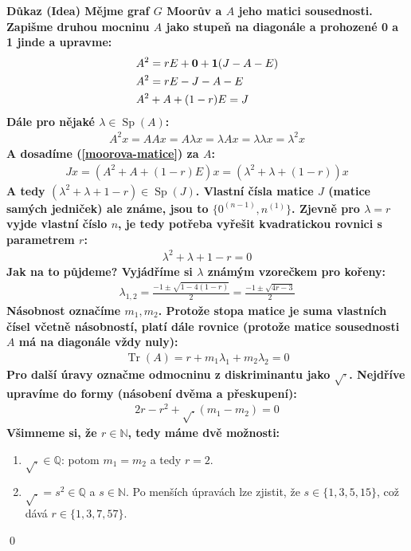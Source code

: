 \documentclass[a4paper,12pt,titlepage]{article}
\newcommand{\dk}{\smallskip\noindent\bf Důkaz\rm{} }
\newcommand{\Q}{\mathbb{Q}}
\newcommand{\N}{\mathbb{N}}
\DeclareMathOperator{\Sp}{Sp}
\DeclareMathOperator{\Tr}{Tr}
\begin{document}
\dk (Idea) Mějme graf $G$ Moorův a $A$ jeho matici sousednosti. Zapišme druhou 
mocninu $A$ jako stupeň na diagonále a prohozené 0 a 1 jinde a upravme:
\begin{align}
	&A^2 = rE + {\bf0} + {\bf1}(J- A-E) \\
	&A^2 = rE - J - A - E \\
	\label{moorova-matice}&A^2 + A + (1-r)E = J
\end{align}
Dále pro nějaké $\lambda\in \Sp(A)$:
\begin{align}
	\label{moorova-mocnina}A^2 x = AAx = A\lambda x = \lambda A x = \lambda 
	\lambda x = \lambda^2 x
\end{align}
A dosadíme (\ref{moorova-matice}) za $A$:
\begin{align}
	Jx = (A^2 + A + (1-r)E)x = (\lambda^2 + \lambda + (1-r))x
\end{align}
A tedy $(\lambda^2 + \lambda + 1 -r) \in \Sp(J)$. Vlastní čísla matice $J$ 
(matice samých jedniček) ale známe, jsou to $\{0^{(n-1)}, n^{(1)}\}$. Zjevně pro 
$\lambda = r$ vyjde vlastní číslo $n$, je tedy potřeba vyřešit kvadratickou 
rovnici s parametrem $r$:
\begin{align}
	\lambda^2 + \lambda + 1 - r = 0
\end{align}
Jak na to půjdeme? Vyjádříme si $\lambda$ známým vzorečkem pro kořeny:
\begin{align}
	\lambda_{1,2} = \frac{-1\pm \sqrt{1-4(1-r)}}{2} = \frac{-1\pm\sqrt{4r-3}}{2}
\end{align}
Násobnost označíme $m_1, m_2$. Protože stopa matice je suma vlastních čísel 
včetně násobností, platí dále rovnice (protože matice sousednosti $A$ má na 
diagonále vždy nuly):
\begin{align}
	\Tr(A) = r+m_1\lambda_1 + m_2\lambda_2 = 0
\end{align}
Pro další úravy označme odmocninu z diskriminantu jako $\sqrt{\cdot}$. Nejdříve 
upravíme do formy (násobení dvěma a přeskupení):
\begin{align}
	2r - r^2 + \sqrt{.}(m_1 - m_2) = 0
\end{align}
Všimneme si, že $r\in\N$, tedy máme dvě možnosti:
\begin{enumerate}
	\item $\sqrt{.} \in \Q$: potom $m_1 = m_2$ a tedy $r = 2$.
	\item $\sqrt{.} = s^2 \in \Q$ a $s \in \N$. Po menších úpravách lze zjistit, 
	že $s\in \{1, 3, 5, 15\}$, což dává $r\in\{1, 3,7,57\}$.
\end{enumerate}
\qed
\end{document}
